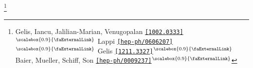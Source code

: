 \documentclass[aspectratio=169,11pt,usenames,dvipsnames]{beamer}
\renewcommand{\thefootnote}{\color{customblue}\faPaperPlaneO}
\newcommand\blfootnote[1]{%
  \begingroup
  \renewcommand\thefootnote{}\footnote{#1}%
  \addtocounter{footnote}{-1}%
  \endgroup
}
\begin{document}
\begin{frame}[noframenumbering]
\begin{columns}[onlytextwidth,t]
\begin{center}
            \end{center}
    \end{columns}
    \vspace{-5pt}
    \blfootnote{\scriptsize Gelis, Iancu, Jalilian-Marian, Venugopalan \href{https://arxiv.org/abs/1002.0333}{{\color{palgold}\texttt{[1002.0333]}$^\text{\scalebox{0.9}{\faExternalLink}}$}} Lappi \href{https://arxiv.org/abs/hep-ph/0606207}{{\color{palviolet}\texttt{[hep-ph/0606207]}$^\text{\scalebox{0.9}{\faExternalLink}}$}} Gelis \href{https://arxiv.org/abs/1211.3327}{{\color{palviolet}\texttt{[1211.3327]}$^\text{\scalebox{0.9}{\faExternalLink}}$}} \\
     \hspace{13.5pt}
     Baier, Mueller, Schiff, Son \href{https://arxiv.org/abs/hep-ph/0009237}{{\color{palteal}\texttt{[hep-ph/0009237]}$^\text{\scalebox{0.9}{\faExternalLink}}$}}}

\end{frame}
\end{document}
